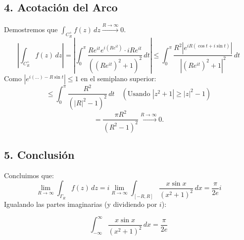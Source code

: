 {\subsection*{4. Acotación del Arco}

Demostremos que $\int_{C_R^+} f(z) \, dz \xrightarrow{R \to \infty} 0$.
\[
\left| \int_{C_R^+} f(z) \, dz \right| = \left| \int_{0}^{\pi} \frac{R e^{it} e^{i(R e^{it})} \cdot i R e^{it}}{((R e^{it})^2 + 1)^2} \, dt \right| \le \int_{0}^{\pi} \frac{R^2 |e^{i R (\cos t + i \sin t)}|}{|(R e^{it})^2 + 1|^2} \, dt
\]
Como $|e^{i(\dots) - R \sin t}| \le 1$ en el semiplano superior:
\[
\le \int_{0}^{\pi} \frac{R^2}{(|R|^2 - 1)^2} \, dt \quad (\text{Usando } |z^2+1| \ge |z|^2-1)
\]
\[
= \frac{\pi R^2}{(R^2 - 1)^2} \xrightarrow{R \to \infty} 0.
\]

\subsection*{5. Conclusión}

Concluimos que:
\[
\lim_{R \to \infty} \int_{\Gamma_R} f(z) \, dz = i \lim_{R \to \infty} \int_{[-R,R]} \frac{x \sin x}{(x^2+1)^2} \, dx = \frac{\pi}{2e} i
\]
Igualando las partes imaginarias (y dividiendo por $i$):

\[
\boxed{ \int_{-\infty}^{\infty} \frac{x \sin x}{(x^2+1)^2} \, dx = \frac{\pi}{2e} }
\]
}

